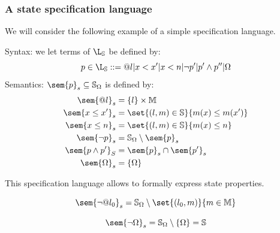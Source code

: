\documentclass[toc, titlepaged]{../cs-classes/cs-classes}
\begin{document}
\subsubsection{A state specification language}
We will consider the following example of a simple specification language.
\begin{definition}
    Syntax: we let terms of $\L_{\S}$ be defined by:
    \begin{equation*}
        p\in\L_{\S} ::= @l | x<x' | x<n | \lnot p' | p'\land p'' | \Omega
    \end{equation*}
    Semantics: $\sem{p}_s\subseteq \S_\Omega$ is defined by:
    \begin{equation*}
        \begin{aligned}
            \sem{@l}_s &= \{l\} \times \mathbb{M}\\
            \sem{x\leq x'}_s &= \set{(l, m)\in\S}{m(x)\leq m(x')}\\
            \sem{x\leq n}_s &= \set{(l, m)\in\S}{m(x)\leq n}\\
            \sem{\lnot p}_s &= \S_\Omega\setminus\sem{p}_s\\
            \sem{p\land p'}_S &= \sem{p}_s \cap \sem{p'}_s\\
            \sem{\Omega}_s &= \{\Omega\}
        \end{aligned}
    \end{equation*}
\end{definition}

\noindent This specification language allows to formally express state properties. 
\begin{example}
    \begin{equation*}
        \sem{\lnot@l_0}_s = \S_\Omega \setminus \set{(l_0, m)}{m\in\mathbb{M}}
    \end{equation*}
\end{example}

\begin{example}
    \begin{equation*}
        \sem{\lnot\Omega}_s = \S_\Omega \setminus \{\Omega\} = \S
    \end{equation*}
\end{example}
\end{document}
